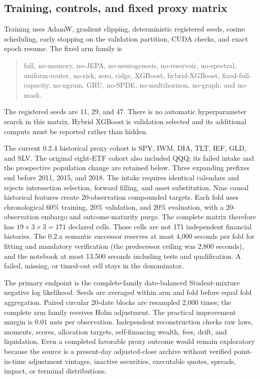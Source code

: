 \documentclass[11pt,a4paper]{article}
\begin{document}
\subsection{Training, controls, and fixed proxy matrix}

Training uses AdamW, gradient clipping, deterministic registered seeds, cosine
scheduling, early stopping on the validation partition, CUDA checks, and exact
epoch resume. The fixed arm family is
\begin{quote}\small
full, no-memory, no-JEPA, no-neurogenesis, no-reservoir, no-spectral,
uniform-router, no-risk, zero, ridge, XGBoost, hybrid-XGBoost,
fixed-full-capacity, no-ngram, GRU, no-SPDE, no-multihorizon, no-graph, and
no-mask.
\end{quote}
The registered seeds are 11, 29, and 47. There is no automatic hyperparameter
search in this matrix. Hybrid XGBoost is validation selected and its additional
compute must be reported rather than hidden.

The current 0.2.4 historical proxy cohort is SPY, IWM, DIA, TLT, IEF, GLD, and SLV. The original eight-ETF cohort also included QQQ; its failed intake and the prospective population change are retained below.
Three expanding prefixes end before 2011, 2015, and 2018. The intake requires
identical calendars and rejects intersection selection, forward filling, and
asset substitution. Nine causal historical features create 20-observation
compounded targets. Each fold uses chronological 60\% training, 20\% validation,
and 20\% evaluation, with a 20-observation embargo and outcome-maturity purge.
The complete matrix therefore has
$19\times3\times3=171$ declared cells. Those cells are not 171 independent
financial histories. The 0.2.x semantic successor reserves at most 4,000 seconds per fold for fitting and mandatory verification (the predecessor ceiling was 2,800 seconds), and the notebook
at most 13,500 seconds including tests and qualification. A failed, missing, or
timed-out cell stays in the denominator.

The primary endpoint is the complete-family date-balanced Student-mixture
negative log likelihood. Seeds are averaged within arm and fold before equal
fold aggregation. Paired circular 20-date blocks are resampled 2,000 times;
the complete arm family receives Holm adjustment. The practical improvement
margin is $0.01$ nats per observation. Independent reconstruction checks raw
laws, moments, scores, allocation targets, self-financing wealth, fees, drift,
and liquidation. Even a completed favorable proxy outcome would remain
exploratory because the source is a present-day adjusted-close archive without
verified point-in-time adjustment vintages, inactive securities, executable
quotes, spreads, impact, or terminal distributions.
\end{document}
